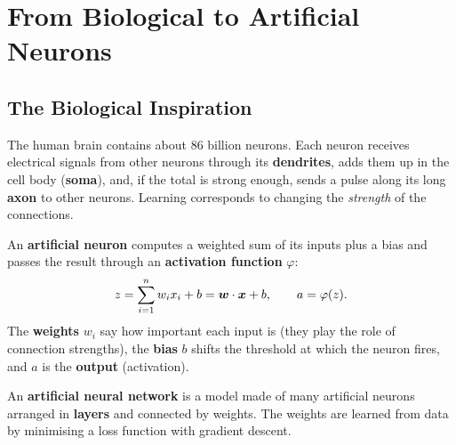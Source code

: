 \section{From Biological to Artificial Neurons}

\subsection{The Biological Inspiration}

The human brain contains about 86 billion neurons. Each neuron receives electrical signals from other neurons through its \textbf{dendrites}, adds them up in the cell body (\textbf{soma}), and, if the total is strong enough, sends a pulse along its long \textbf{axon} to other neurons. Learning corresponds to changing the \emph{strength} of the connections.

\begin{definition}
An \textbf{artificial neuron} computes a weighted sum of its inputs plus a bias and passes the result through an \textbf{activation function} $\varphi$:
\[
  z=\sum_{i=1}^{n}w_ix_i+b=\boldsymbol{w}\cdot\boldsymbol{x}+b,\qquad a=\varphi(z).
\]
The \textbf{weights} $w_i$ say how important each input is (they play the role of connection strengths), the \textbf{bias} $b$ shifts the threshold at which the neuron fires, and $a$ is the \textbf{output} (activation).
\end{definition}

\begin{definition}
An \textbf{artificial neural network} is a model made of many artificial neurons arranged in \textbf{layers} and connected by weights. The weights are learned from data by minimising a loss function with gradient descent.
\end{definition}

